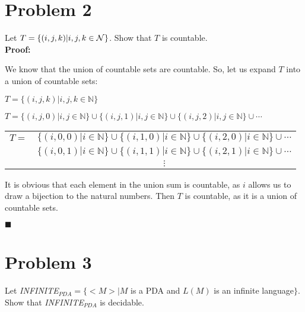 \documentclass[11pt]{article}
\begin{document}
\section*{Problem 2}

    Let $T=\{(i,j,k)|i,j,k\in{\cal N}\}$. Show that $T$ is countable.\\
    
    \textbf{Proof:}
    
    \noindent
    We know that the union of countable sets are countable. So, let us expand $T$ into a union of countable sets:
    
    \setlength{\parskip}{0em}
    \begin{center}$T=\{(i,j,k)|i,j,k\in\mathbb{N}\}$\end{center}
    \begin{center} $T = \{(i,j,0) | i, j \in \mathbb{N}\} \cup \{(i,j,1) | i, j \in \mathbb{N}\}  \cup \{(i,j,2) | i, j \in \mathbb{N}\} \cup \cdots$   \end{center}
    \begin{center}
        \begin{tabular}{c c}
            $T = $ & $\{(i,0,0) | i \in \mathbb{N}\} \cup \{(i,1,0) | i \in \mathbb{N}\} \cup \{(i,2,0) | i \in \mathbb{N}\} \cup \cdots$ \\
              & $\{(i,0,1) | i \in \mathbb{N}\} \cup \{(i,1,1) | i \in \mathbb{N}\} \cup \{(i,2,1) | i \in \mathbb{N}\} \cup \cdots$\\
              & $\vdots$\\
        \end{tabular}
    \end{center}
    \setlength{\parskip}{0.5em}
    It is obvious that each element in the union sum is countable, as $i$ allows us to draw a bijection to the natural numbers. Then $T$ is countable, as it is a union of countable sets.
    \begin{flushright}$\blacksquare$\end{flushright}
\newpage





\section*{Problem 3}

    Let {\em INFINITE}$_{PDA}=\{<M>|M$ is a PDA and $L(M)$ is an infinite language$\}$.
    Show that {\em INFINITE}$_{PDA}$ is decidable.
    \newline
    
\end{document}
